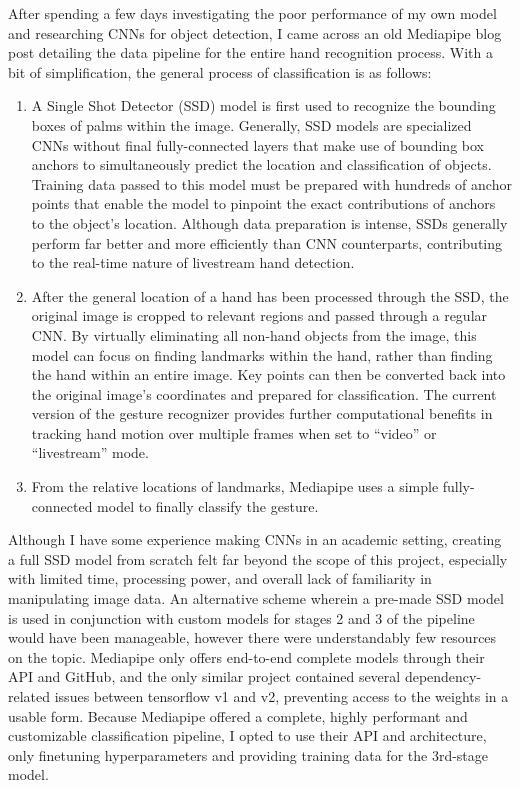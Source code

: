 \documentclass{article}
\begin{document}
After spending a few days investigating the poor performance of my own model and researching CNNs for object detection, I came across an old Mediapipe blog post \cite{mediapipeLegacyHands} detailing the data pipeline for the entire hand recognition process. With a bit of simplification, the general process of classification is as follows:
\begin{enumerate}
    \item A Single Shot Detector (SSD) model \cite{Liu_2016} is first used to recognize the bounding boxes of palms within the image. Generally, SSD models are specialized CNNs without final fully-connected layers that make use of bounding box anchors to simultaneously predict the location and classification of objects. Training data passed to this model must be prepared with hundreds of anchor points that enable the model to pinpoint the exact contributions of anchors to the object's location. Although data preparation is intense, SSDs generally perform far better and more efficiently than CNN counterparts, contributing to the real-time nature of livestream hand detection.
    \item After the general location of a hand has been processed through the SSD, the original image is cropped to relevant regions and passed through a regular CNN. By virtually eliminating all non-hand objects from the image, this model can focus on finding landmarks within the hand, rather than finding the hand within an entire image. Key points can then be converted back into the original image's coordinates and prepared for classification. The current version of the gesture recognizer \cite{gesture_recognizer} provides further computational benefits in tracking hand motion over multiple frames when set to ``video'' or ``livestream'' mode.
    \item From the relative locations of landmarks, Mediapipe uses a simple fully-connected model to finally classify the gesture.
\end{enumerate}

Although I have some experience making CNNs in an academic setting, creating a full SSD model from scratch felt far beyond the scope of this project, especially with limited time, processing power, and overall lack of familiarity in manipulating image data. An alternative scheme wherein a pre-made SSD model is used in conjunction with custom models for stages 2 and 3 of the pipeline would have been manageable, however there were understandably few resources on the topic. Mediapipe only offers end-to-end complete models through their API and GitHub, and the only similar project \cite{Dibia2017} contained several dependency-related issues between tensorflow v1 and v2, preventing access to the weights in a usable form. Because Mediapipe offered a complete, highly performant and customizable classification pipeline, I opted to use their API and architecture, only finetuning hyperparameters and providing training data for the 3rd-stage model.
\end{document}
